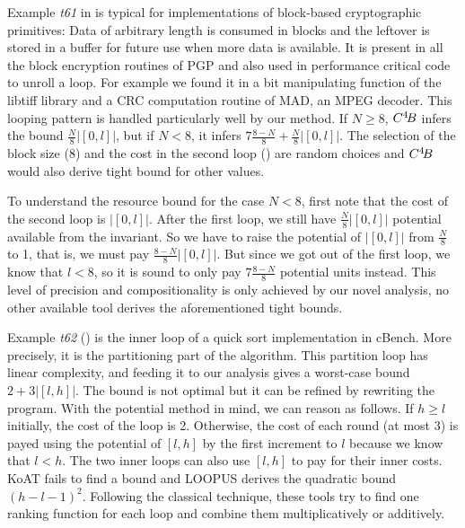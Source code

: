 \documentclass[nocopyrightspace,preprint,pldi]{sigplanconf-pldi15}
\newcommand{\pref}[1]{\prettyref{#1}}
\begin{document}
Example \emph{t61} in \pref{fig:ex_list_2} is typical for implementations
of block-based cryptographic primitives: Data of arbitrary length is
consumed in blocks and the leftover is stored in a buffer for future use
when more data is available.  It is present in all the block encryption
routines of PGP and also used in performance critical
code to unroll a loop. For example we found it in a bit manipulating
function of the libtiff library and a CRC computation routine of MAD,
an MPEG decoder.  This looping pattern is handled particularly well
by our method. If $N \geq 8$, $C^4\!B$ infers the bound
$\frac{N}{8} |[0,l]|$, but if $N<8$, it infers $7\frac{8-N}{8} +
\frac{N}{8}|[0,l]|$. The selection of the block size ($8$) and the cost
in the second loop () are random choices and $C^4\!B$
would also derive tight bound for other values.

To understand the resource bound for the case $N<8$, first note that the cost of
the second loop is $|[0,l]|$.  After the first loop, we still have
$\frac{N}{8}|[0,l]|$ potential available from the invariant.  So we have
to raise the potential of $|[0,l]|$ from $\frac{N}{8}$ to 1, that is,
we must pay $\frac{8-N}{8}|[0,l]|$.  But since we got out of the first
loop, we know that $l<8$, so it is sound to only pay $7\frac{8-N}{8}$
potential units instead.
%
This level of precision and compositionality is only achieved by
our novel analysis, no other available tool derives the aforementioned
 tight bounds.

Example \emph{t62} (\pref{fig:ex_list_2})
is the inner loop of a quick sort implementation in cBench.  More
precisely, it is the partitioning part of the algorithm.  This partition
loop has linear complexity, and feeding it to our analysis gives a
worst-case bound $2+3|[l,h]|$.  The bound is not optimal but it can be
refined by rewriting the program. %
With the potential method in mind, we can reason as follows.
%
If $h \geq l$ initially, the cost of the loop is 2.
Otherwise, the cost of each round (at
most 3) is payed using the potential of $[l,h]$ by the first
increment to $l$ because we know that $l<h$.  The two inner loops
can also use $[l,h]$ to pay for their inner costs.
%
KoAT fails to
find a bound and LOOPUS derives the quadratic bound
$(h-l-1)^2$.  Following the classical technique, these tools try to find one
ranking function for each loop and combine them multiplicatively
or additively.
\end{document}
